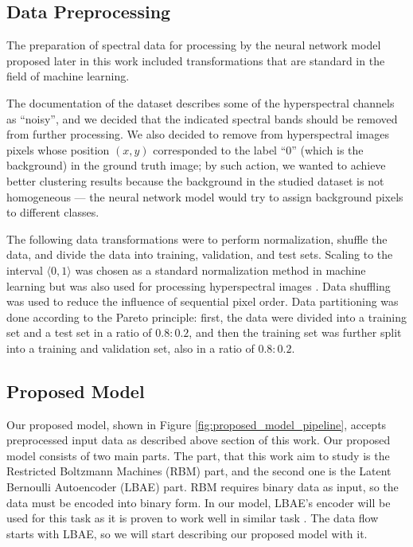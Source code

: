 \documentclass[a4paper,12pt]{article}
\begin{document}
\subsection{Data Preprocessing}\label{data_preprocessing_section}
The preparation of spectral data for processing by the neural network model proposed later in this work included transformations that are standard in the field of machine learning.

The documentation of the dataset \cite{Romaszewski2021} describes some of the hyperspectral channels as “noisy”, and we decided that the indicated spectral bands should be removed from further processing. We also decided to remove from hyperspectral images pixels whose position $(x,y)$ corresponded to the label ``0'' (which is the background) in the ground truth image; by such action, we wanted to achieve better clustering results because the background in the studied dataset is not homogeneous --- the neural network model would try to assign background pixels to different classes.

The following data transformations were to perform normalization, shuffle the data, and divide the data into training, validation, and test sets. Scaling to the interval $\langle 0, 1 \rangle$ was chosen as a standard normalization method in machine learning \cite{raschka2019} but was also used for processing hyperspectral images \cite{Głomb2023}. Data shuffling was used to reduce the influence of sequential pixel order. Data partitioning was done according to the Pareto principle: first, the data were divided into a training set and a test set in a ratio of $0.8:0.2$, and then the training set was further split into a training and validation set, also in a ratio of $0.8:0.2$.

\subsection{Proposed Model}\label{proposed_model_section}
Our proposed model, shown in Figure \ref{fig:proposed_model_pipeline}, accepts preprocessed input data as described above section of this work. Our proposed model consists of two main parts. The part, that this work aim to study is the Restricted Boltzmann Machines (RBM) part, and the second one is the Latent Bernoulli Autoencoder (LBAE) part. RBM requires binary data as input, so the data must be encoded into binary form. In our model, LBAE's encoder will be used for this task as it is proven to work well in similar task \cite{QBM4EO}. The data flow starts with LBAE, so we will start describing our proposed model with it.
\end{document}

